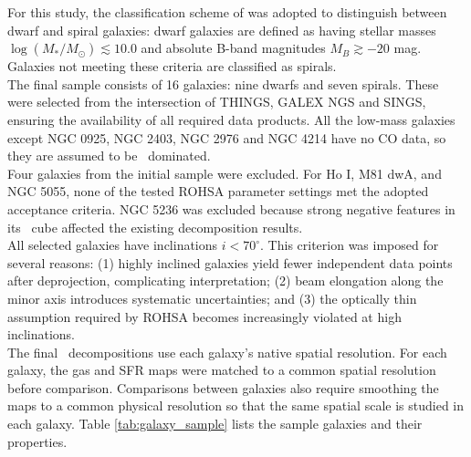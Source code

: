 For this study, the classification scheme of \citet{Leroy2008} was adopted to distinguish between dwarf and spiral galaxies: dwarf galaxies are defined as having stellar masses $\log(M_*/M_\odot) \lesssim 10.0$ and absolute B-band magnitudes $M_B \gtrsim -20$ mag. Galaxies not meeting these criteria are classified as spirals.\\\indent
The final sample consists of 16 galaxies: nine dwarfs and seven spirals. These were selected from the intersection of THINGS, GALEX NGS and SINGS, ensuring the availability of all required data products. All the low-mass galaxies except NGC 0925, NGC 2403, NGC 2976 and NGC 4214 have no CO data, so they are assumed to be \HI\ dominated.\\\indent
Four galaxies from the initial sample were excluded. For Ho I, M81 dwA, and NGC 5055, none of the tested ROHSA parameter settings met the adopted acceptance criteria. NGC 5236 was excluded because strong negative features in its \HI\ cube affected the existing decomposition results.\\\indent
All selected galaxies have inclinations $i < 70^\circ$. This criterion was imposed for several reasons: (1) highly inclined galaxies yield fewer independent data points after deprojection, complicating interpretation; (2) beam elongation along the minor axis introduces systematic uncertainties; and (3) the optically thin assumption required by ROHSA becomes increasingly violated at high inclinations.\\\indent
The final \HI\ decompositions use each galaxy's native spatial resolution. For each galaxy, the gas and SFR maps were matched to a common spatial resolution before comparison. Comparisons between galaxies also require smoothing the maps to a common physical resolution so that the same spatial scale is studied in each galaxy. Table \ref{tab:galaxy_sample} lists the sample galaxies and their properties.


